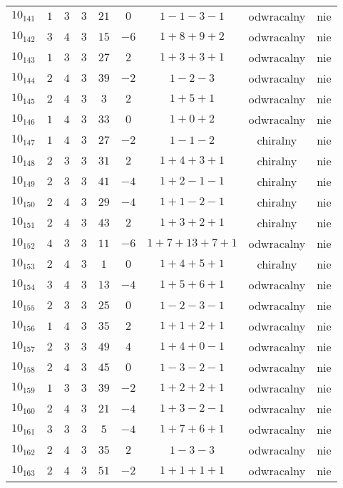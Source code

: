 \begin{longtable}{ccccccccc}
$10_{141}$ & $1$ & $3$ & $3$ & $21$ & $0$ & $1-1-3-1$ & odwracalny & nie \\
$10_{142}$ & $3$ & $4$ & $3$ & $15$ & $-6$ & $1+8+9+2$ & odwracalny & nie \\
$10_{143}$ & $1$ & $3$ & $3$ & $27$ & $2$ & $1+3+3+1$ & odwracalny & nie \\
$10_{144}$ & $2$ & $4$ & $3$ & $39$ & $-2$ & $1-2-3$ & odwracalny & nie \\
$10_{145}$ & $2$ & $4$ & $3$ & $3$ & $2$ & $1+5+1$ & odwracalny & nie \\
$10_{146}$ & $1$ & $4$ & $3$ & $33$ & $0$ & $1+0+2$ & odwracalny & nie \\
$10_{147}$ & $1$ & $4$ & $3$ & $27$ & $-2$ & $1-1-2$ & chiralny & nie \\
$10_{148}$ & $2$ & $3$ & $3$ & $31$ & $2$ & $1+4+3+1$ & chiralny & nie \\
$10_{149}$ & $2$ & $3$ & $3$ & $41$ & $-4$ & $1+2-1-1$ & chiralny & nie \\
$10_{150}$ & $2$ & $4$ & $3$ & $29$ & $-4$ & $1+1-2-1$ & chiralny & nie \\
$10_{151}$ & $2$ & $4$ & $3$ & $43$ & $2$ & $1+3+2+1$ & chiralny & nie \\
$10_{152}$ & $4$ & $3$ & $3$ & $11$ & $-6$ & $1+7+13+7+1$ & odwracalny & nie \\
$10_{153}$ & $2$ & $4$ & $3$ & $1$ & $0$ & $1+4+5+1$ & chiralny & nie \\
$10_{154}$ & $3$ & $4$ & $3$ & $13$ & $-4$ & $1+5+6+1$ & odwracalny & nie \\
$10_{155}$ & $2$ & $3$ & $3$ & $25$ & $0$ & $1-2-3-1$ & odwracalny & nie \\
$10_{156}$ & $1$ & $4$ & $3$ & $35$ & $2$ & $1+1+2+1$ & odwracalny & nie \\
$10_{157}$ & $2$ & $3$ & $3$ & $49$ & $4$ & $1+4+0-1$ & odwracalny & nie \\
$10_{158}$ & $2$ & $4$ & $3$ & $45$ & $0$ & $1-3-2-1$ & odwracalny & nie \\
$10_{159}$ & $1$ & $3$ & $3$ & $39$ & $-2$ & $1+2+2+1$ & odwracalny & nie \\
$10_{160}$ & $2$ & $4$ & $3$ & $21$ & $-4$ & $1+3-2-1$ & odwracalny & nie \\
$10_{161}$ & $3$ & $3$ & $3$ & $5$ & $-4$ & $1+7+6+1$ & odwracalny & nie \\
$10_{162}$ & $2$ & $4$ & $3$ & $35$ & $2$ & $1-3-3$ & odwracalny & nie \\
$10_{163}$ & $2$ & $4$ & $3$ & $51$ & $-2$ & $1+1+1+1$ & odwracalny & nie \\

\end{longtable}
